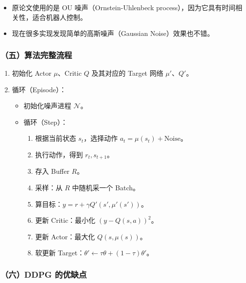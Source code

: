 \begin{itemize}
\tightlist
\item
  原论文使用的是 OU 噪声（Ornstein-Uhlenbeck process），因为它具有时间相关性，适合机器人控制。
\item
  现在很多实现发现简单的高斯噪声（Gaussian Noise）效果也不错。
\end{itemize}

\hypertarget{ux4e94ux7b97ux6cd5ux5b8cux6574ux6d41ux7a0b}{%
\subsubsection{（五）算法完整流程}\label{ux4e94ux7b97ux6cd5ux5b8cux6574ux6d41ux7a0b}}

\begin{enumerate}
\def\labelenumi{\arabic{enumi}.}
\tightlist
\item
  初始化 Actor \(\mu\)、Critic \(Q\) 及其对应的 Target 网络 \(\mu'\)、\(Q'\)。
\item
{}
  循环（Episode）：

  \begin{itemize}
  \tightlist
  \item
    初始化噪声进程 \(\mathcal{N}\)。
  \item
{}
    循环（Step）：

    \begin{enumerate}
    \def\labelenumii{\arabic{enumii}.}
    \tightlist
    \item
      根据当前状态 \(s_t\)，选择动作 \(a_t=\mu(s_t)+\mathrm{Noise}\)。
    \item
      执行动作，得到 \(r_t,s_{t+1}\)。
    \item
      存入 Buffer \(R\)。
    \item
      采样：从 \(R\) 中随机采一个 Batch。
    \item
      算目标：\(y=r+\gamma Q'(s',\mu'(s'))\)。
    \item
      更新 Critic：最小化 \((y-Q(s,a))^{2}\)。
    \item
      更新 Actor：最大化 \(Q(s,\mu(s))\)。
    \item
      软更新 Target：\(\theta'\leftarrow\tau\theta+(1-\tau)\theta'\)。
    \end{enumerate}
  \end{itemize}
\end{enumerate}

\hypertarget{ux516dddpg-ux7684ux4f18ux7f3aux70b9}{%
\subsubsection{（六）DDPG 的优缺点}\label{ux516dddpg-ux7684ux4f18ux7f3aux70b9}}

